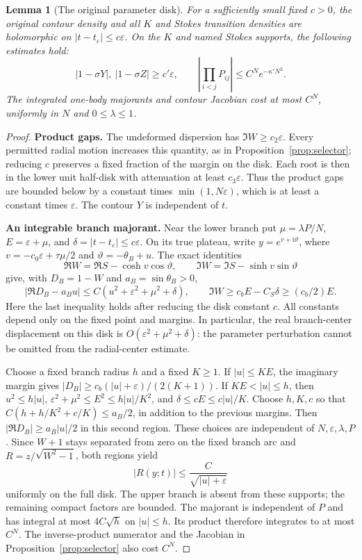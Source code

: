 \documentclass[11pt]{article}
\numberwithin{equation}{section}
\newtheorem{lemma}[theorem]{Lemma}
\theoremstyle{definition}
\newcommand{\ii}{\mathrm i}
\newcommand{\eps}{\varepsilon}
\newcommand{\se}{t_\varepsilon}
\begin{document}
\begin{lemma}[The original parameter disk]\label{lem:originaldisk}
For a sufficiently small fixed \(c>0\), the original contour
density and all \(K\) and Stokes transition densities are holomorphic
on \(|t-t_\eps|\le c\eps\). On the \(K\) and named Stokes
supports, the following estimates hold:
\[
 |1-\sigma Y|,\ |1-\sigma Z|\ge c'\eps,\qquad
 \left|\prod_{i<j}P_{ij}\right|\le C^Ne^{-\kappa' N^2}.
\]
The integrated one-body majorants and contour Jacobian cost
at most \(C^N\), uniformly in \(N\) and \(0\le\lambda\le1\).
\end{lemma}
\begin{proof}
\noindent\textbf{Product gaps.} The undeformed dispersion has \(\Im W\ge c_2\eps\).
Every permitted radial motion increases this quantity, as in
Proposition~\ref{prop:selector}; reducing \(c\) preserves a
fixed fraction of the margin on the disk. Each root is then
in the lower unit half-disk with attenuation at least \(c_3\eps\).
Thus the product gaps are bounded below by a constant times
\(\min(1,N\eps)\), which is at least a constant times \(\eps\).
The contour \(Y\) is independent of \(t\).

\par\smallskip\noindent\textbf{An integrable branch majorant.} Near the lower branch put \(\mu=\lambda P/N\),
\(E=\eps+\mu\), and \(\delta=|t-\se|\le c\eps\).
On its true plateau, write
\(y=e^{v+\ii\vartheta}\), where
\(v=-c_0\eps+\tau \mu/2\) and \(\vartheta=-\theta_B+u\).
The exact identities
\[
 \Re W=\Re S-\cosh v\cos\vartheta,\qquad
 \Im W=\Im S-\sinh v\sin\vartheta
\]
give, with \(D_B=1-W\) and \(a_B=\sin\theta_B>0\),
\[
 |\Re D_B-a_Bu|
 \le C(u^2+\eps^2+\mu^2+\delta),\qquad
 \Im W\ge c_bE-C_S\delta\ge(c_b/2)E.
\]
Here the last inequality holds after reducing the disk constant
\(c\). All constants depend only on the fixed point and margins.
In particular, the real branch-center displacement on this disk is
\(O(\eps^2+\mu^2+\delta)\): the parameter perturbation cannot be
omitted from the radial-center estimate.

Choose a fixed branch radius \(h\) and a fixed \(K\ge1\).
If \(|u|\le KE\), the imaginary margin gives
\(|D_B|\ge c_b(|u|+\eps)/(2(K+1))\).
If \(KE<|u|\le h\), then
\(u^2\le h|u|\), \(\eps^2+\mu^2\le E^2\le h|u|/K^2\),
and \(\delta\le cE\le c|u|/K\).
Choose \(h,K,c\) so that
\(C(h+h/K^2+c/K)\le a_B/2\), in addition to the previous margins.
Then \(|\Re D_B|\ge a_B|u|/2\) in this second region.
These choices are independent of \(N,\eps,\lambda,P\).
Since \(W+1\) stays separated from zero on the fixed branch arc
and \(R=z/\sqrt{W^2-1}\), both regions yield
\[
 |R(y;t)|\le \frac{C}{\sqrt{|u|+\eps}}
\]
uniformly on the full disk. The upper branch is absent from
these supports; the remaining compact factors are bounded.
The majorant is independent of \(P\) and has integral at most
\(4C\sqrt h\) on \(|u|\le h\). Its product therefore integrates to
at most \(C^N\). The inverse-product numerator
and the Jacobian in Proposition~\ref{prop:selector} also cost \(C^N\).


\end{proof}
\end{document}
